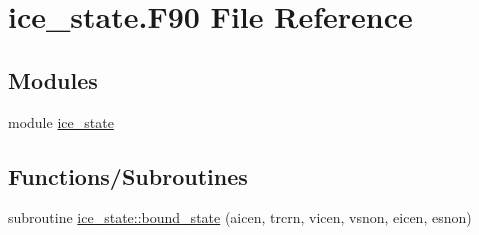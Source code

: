 \hypertarget{ice__state_8F90}{
\section{ice\_\-state.F90 File Reference}
\label{ice__state_8F90}
}
\subsection*{Modules}
\begin{DoxyCompactItemize}
\item 
module \hyperlink{namespaceice__state}{ice\_\-state}
\end{DoxyCompactItemize}
\subsection*{Functions/Subroutines}
\begin{DoxyCompactItemize}
\item 
subroutine \hyperlink{namespaceice__state_a78d0e2cfa0bf0b06213526515ea5bb15}{ice\_\-state::bound\_\-state} (aicen, trcrn, vicen, vsnon, eicen, esnon)
\end{DoxyCompactItemize}
